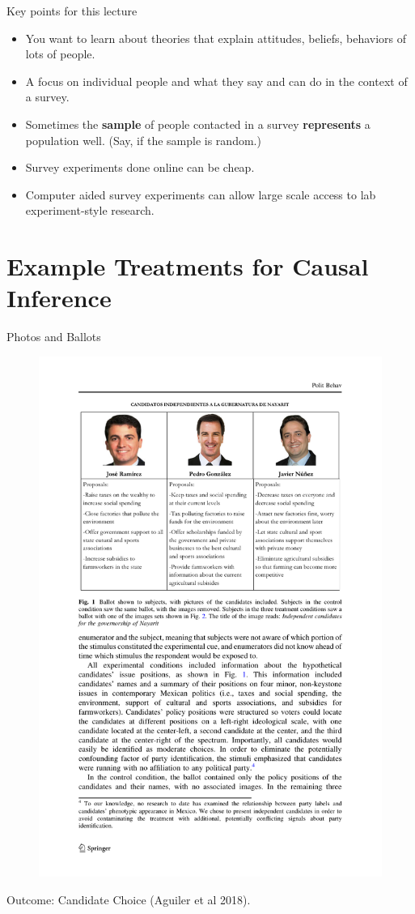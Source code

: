 \documentclass[
  ignorenonframetext,
]{beamer}
\providecommand{\tightlist}{%
  \setlength{\itemsep}{0pt}\setlength{\parskip}{0pt}}
\begin{document}
\begin{frame}[allowframebreaks]{Key points for this lecture}
\begin{itemize}
  \begin{itemize}
  \tightlist
  \item
    You want to learn about theories that explain attitudes, beliefs,
    behaviors of lots of people.
  \item
    A focus on individual people and what they say and can do in the
    context of a survey.
  \item
    Sometimes the \textbf{sample} of people contacted in a survey
    \textbf{represents} a population well. (Say, if the sample is
    random.)
  \item
    Survey experiments done online can be cheap.
  \item
    Computer aided survey experiments can allow large scale access to
    lab experiment-style research.
  \end{itemize}
\end{itemize}
\end{frame}

\hypertarget{example-treatments-for-causal-inference}{%
\section{Example Treatments for Causal
Inference}\label{example-treatments-for-causal-inference}}

\begin{frame}{Photos and Ballots}
\protect\hypertarget{photos-and-ballots}{}
\begin{figure}

{\centering \includegraphics[width=0.7\linewidth]{./figs/survey-exp-aguilar-18_ballots} 

}

\end{figure}

Outcome: Candidate Choice (Aguiler et al 2018).
\end{frame}
\end{document}

